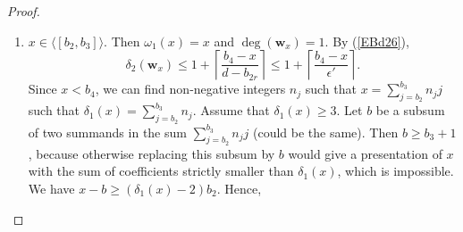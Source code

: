 \documentclass[10pt,a4paper]{amsart}
\def\deg{\operatorname{deg}}
\def\wbf{{\mathbf w}}
\begin{document}
\begin{proof}
\begin{enumerate}
\begin{enumerate}[\((\text{b}1)\)]
   If $d+x-b_4$ belongs to $j$-th gap with $i\neq j$, then similar to the subcase \(\text{(a2)}\), we can conclude  that 
  $$\delta_1(\wbf_x) = \delta_1(d+ x)  \leq 2+ \left\lfloor \frac{\lambda_j}{b_2} \right\rfloor.$$
  On the other hand,  using the relation $d-x = (d-b_4) + (b_4-x)$,  as shown in the proof of Corollary \ref{A5}\((i)\), 
   \begin{equation}\label{EBd26}
   \delta_2(\wbf_x)  \leq 1 +  \left\lceil \frac{b_4-x}{d-b_{2r}} \right\rceil \leq  1+ \left\lceil \frac{\lambda_i}{d-b_{2r}} \right\rceil \leq 2+ \left\lfloor \frac{\lambda_i -1}{d-b_{2r}} \right\rfloor.
    \end{equation}
   Hence,  the argument at the end of Case  gives  $D(x) \le M$.
  
  The remaining case is  $b_3< d+x-b_4 < b_4$; that is both $x$ and $d+x-b_4$ belong to the same $i$-th gap. Using the relation $d+x = b_3 + b_4 + (d+x- b_3-b_4)$, similar to the subcase (a1) we get
  $$\delta_1(\wbf_x) = \delta_1(d+ x)  \leq 2+ \left\lfloor \frac{d+x-b_3-b_4}{b_2} \right\rfloor \leq 2+ \left\lfloor \frac{d+x-b_3-b_4}{\epsilon'} \right\rfloor.$$
  On the other hand $d-x = 2(d-b_4) + (b_4 - (d+x-b_4))$. Note that $1, d-b_4 \in A_2$. As shown in the proof of Corollary \ref{A5}\((i)\), 
   $$\delta_2(\wbf_x)  = \delta_2(d-x) \leq 2 + \left\lceil \frac{b_4 - (d+x-b_4)}{d-b_{2r}} \right\rceil \leq 2 +  \left\lceil \frac{2b_4 - (d+x)}{\epsilon'} \right\rceil.$$
   Hence,
   \begin{align*}
       D(x) &\leq \left\lfloor \frac{d+x-b_3-b_4}{\epsilon'} \right\rfloor + 
 \left\lceil \frac{2b_4 - (d+x)}{\epsilon'} \right\rceil \\
&\leq \left\lceil \frac{b_4 - b_3}{\epsilon'} \right\rceil = \left\lfloor \frac{\lambda_i}{\epsilon'} \right\rfloor + 1 \leq M+ 1.
   \end{align*}
         \item $x\in \langle [b_2,b_3]\rangle$. Then $\omega_1(x) =x$ and $\deg(\wbf_x) = 1$. By (\ref{EBd26}),
   $$\delta_2(\wbf_x)  \leq 1+ \left\lceil \frac{b_4 - x}{d-b_{2r}} \right\rceil \leq 1 +  \left\lceil \frac{b_4 - x}{\epsilon'} \right\rceil.$$
   Since $x< b_4$, we can find non-negative integers $n_j$ such that $x =  \sum_{j=b_2}^{b_3} n_jj$ such that $\delta_1(x) =  \sum_{j=b_2}^{b_3} n_j$. Assume that $\delta_1(x) \geq 3$. Let $b$ be a subsum of two summands in the sum $ \sum_{j=b_2}^{b_3} n_jj$ (could be the same). Then $b\geq b_3+1$, because otherwise replacing this subsum by $b$ would give a presentation of $x$ with the sum of coefficients strictly smaller than $\delta_1(x)$, which is impossible. We have $x-b\geq (\delta_1(x) - 2)b_2$. Hence,

\end{enumerate}
\end{enumerate}
\end{proof}
\end{document}
